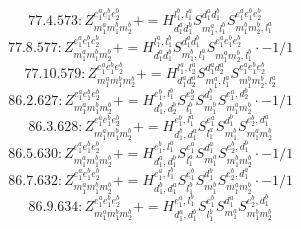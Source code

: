 \documentclass[letterpaper,10pt,fleqn,leqno,onecolumn]{article}
\begin{document}
\begin{equation} \;\;\;\;\;\;  77.4.573: Z^{e_{1}^{a}e_{1}^{b}e_{2}^{b}}_{m_{1}^{a}m_{1}^{b}m_{2}^{b}}+=H^{l_{1}^{b},l_{1}^{a}}_{d_{1}^{a}d_{1}^{b}}S^{d_{1}^{a}d_{1}^{b}}_{m_{1}^{a},l_{1}^{b}}S^{e_{1}^{a}e_{1}^{b}e_{2}^{b}}_{m_{1}^{b}m_{2}^{b},l_{1}^{a}} \end{equation}
\begin{equation} \;\;\;\;\;\;  77.8.577: Z^{e_{1}^{a}e_{1}^{b}e_{2}^{b}}_{m_{1}^{a}m_{1}^{b}m_{2}^{b}}+=H^{l_{1}^{a},l_{1}^{b}}_{d_{1}^{a}d_{1}^{b}}S^{d_{1}^{a}d_{1}^{b}}_{m_{1}^{b},l_{1}^{a}}S^{e_{1}^{a}e_{1}^{b}e_{2}^{b}}_{m_{1}^{a}m_{2}^{b},l_{1}^{b}}\cdot -1/1 \end{equation}
\begin{equation} \;\;\;\;\;\;  77.10.579: Z^{e_{1}^{a}e_{1}^{b}e_{2}^{b}}_{m_{1}^{a}m_{1}^{b}m_{2}^{b}}+=H^{l_{1}^{a},l_{2}^{a}}_{d_{1}^{a}d_{2}^{a}}S^{d_{1}^{a}d_{2}^{a}}_{m_{1}^{a},l_{1}^{a}}S^{e_{1}^{a}e_{1}^{b}e_{2}^{b}}_{m_{1}^{b}m_{2}^{b},l_{2}^{a}} \end{equation}
\begin{equation} \;\;\;\;\;\;  86.2.627: Z^{e_{1}^{a}e_{1}^{b}e_{2}^{b}}_{m_{1}^{a}m_{1}^{b}m_{2}^{b}}+=H^{e_{1}^{b},l_{1}^{b}}_{d_{1}^{b},d_{2}^{b}}S^{e_{2}^{b}}_{l_{1}^{b}}S^{d_{1}^{b}}_{m_{1}^{b}}S^{e_{1}^{a},d_{2}^{b}}_{m_{1}^{a}m_{2}^{b}}\cdot -1/1 \end{equation}
\begin{equation} \;\;\;\;\;\;  86.3.628: Z^{e_{1}^{a}e_{1}^{b}e_{2}^{b}}_{m_{1}^{a}m_{1}^{b}m_{2}^{b}}+=H^{e_{1}^{b},l_{1}^{a}}_{d_{1}^{b},d_{1}^{a}}S^{e_{1}^{a}}_{l_{1}^{a}}S^{d_{1}^{b}}_{m_{1}^{b}}S^{e_{2}^{b},d_{1}^{a}}_{m_{1}^{a}m_{2}^{b}} \end{equation}
\begin{equation} \;\;\;\;\;\;  86.5.630: Z^{e_{1}^{a}e_{1}^{b}e_{2}^{b}}_{m_{1}^{a}m_{1}^{b}m_{2}^{b}}+=H^{e_{1}^{b},l_{1}^{a}}_{d_{1}^{a},d_{1}^{b}}S^{e_{1}^{a}}_{l_{1}^{a}}S^{d_{1}^{a}}_{m_{1}^{a}}S^{e_{2}^{b},d_{1}^{b}}_{m_{1}^{b}m_{2}^{b}}\cdot -1/1 \end{equation}
\begin{equation} \;\;\;\;\;\;  86.7.632: Z^{e_{1}^{a}e_{1}^{b}e_{2}^{b}}_{m_{1}^{a}m_{1}^{b}m_{2}^{b}}+=H^{e_{1}^{a},l_{1}^{b}}_{d_{1}^{b},d_{1}^{a}}S^{e_{1}^{b}}_{l_{1}^{b}}S^{d_{1}^{b}}_{m_{1}^{b}}S^{e_{2}^{b},d_{1}^{a}}_{m_{1}^{a}m_{2}^{b}}\cdot -1/1 \end{equation}
\begin{equation} \;\;\;\;\;\;  86.9.634: Z^{e_{1}^{a}e_{1}^{b}e_{2}^{b}}_{m_{1}^{a}m_{1}^{b}m_{2}^{b}}+=H^{e_{1}^{a},l_{1}^{b}}_{d_{1}^{a},d_{1}^{b}}S^{e_{1}^{b}}_{l_{1}^{b}}S^{d_{1}^{a}}_{m_{1}^{a}}S^{e_{2}^{b},d_{1}^{b}}_{m_{1}^{b}m_{2}^{b}} \end{equation}
\end{document}
